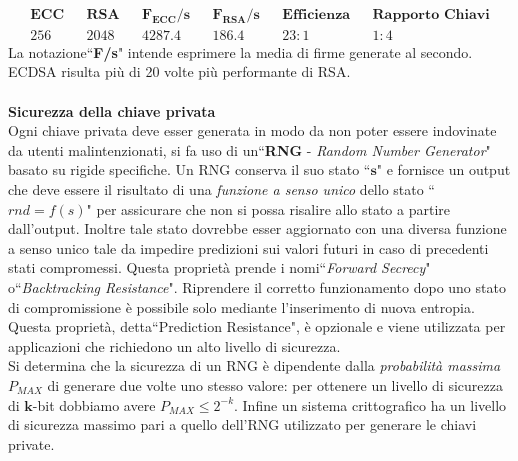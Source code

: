 \documentclass[a4paper,12pt]{tesiinfo}
\begin{document}
\begin{align*}
    &\textbf{ECC}& &\textbf{RSA}& &\textbf{$\mathbold{F_{ECC}}$/s}& &\textbf{$\mathbold{F_{RSA}}$/s}& &\textbf{Efficienza}& &\textbf{Rapporto Chiavi}&\\
    &256& &2048& &4287.4& &186.4& &23:1& &1:4&
\end{align*}
La notazione``\textbf{F/s}" intende esprimere la media di firme generate al secondo.\\
ECDSA risulta pi\`u di 20 volte pi\`u performante di RSA.
\\
\\
\textbf{Sicurezza della chiave privata}
\\
Ogni chiave privata deve esser generata in modo da non poter essere indovinate da utenti malintenzionati, si fa uso di un``\textbf{RNG} - \textit{Random Number Generator}" basato su rigide specifiche. Un RNG conserva il suo stato ``$\mathbold{s}$" e fornisce un output che deve essere il risultato di una \textit{funzione a senso unico} dello stato ``${rnd = f(s)}$" per assicurare che non si possa risalire allo stato a partire dall'output. Inoltre tale stato dovrebbe esser aggiornato con una diversa funzione a senso unico tale da impedire predizioni sui valori futuri in caso di precedenti stati compromessi. Questa propriet\`a prende i nomi``\textit{Forward Secrecy}" o``\textit{Backtracking Resistance}". Riprendere il corretto funzionamento dopo uno stato di compromissione \`e possibile solo mediante l'inserimento di nuova entropia. Questa propriet\`a, detta``Prediction Resistance", \`e opzionale e viene utilizzata per applicazioni che richiedono un alto livello di sicurezza.
\\
Si determina che la sicurezza di un RNG \`e dipendente dalla \textit{probabilit\`a massima} ${P_{MAX}}$ di generare due volte uno stesso valore: per ottenere un livello di sicurezza di $\mathbold{k}$-bit dobbiamo avere $P_{MAX} \leq 2^{-k}$.
Infine un sistema crittografico ha un livello di sicurezza massimo pari a quello dell'RNG utilizzato per generare le chiavi private.
\\
\end{document}
